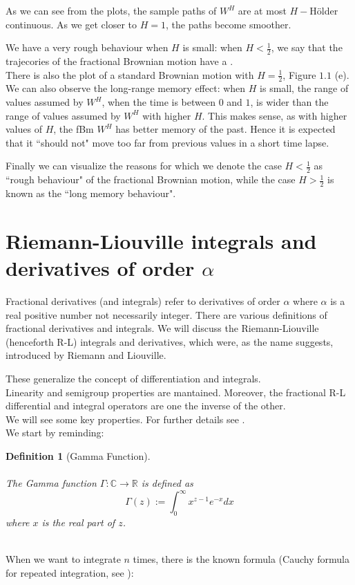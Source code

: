 \documentclass[a4paper,italian,11pt]{book}
\theoremstyle{plain}
\newtheorem{definition}{Definition}
\theoremstyle{remark}
\theoremstyle{plain}
\begin{document}
\medskip
\medskip

As we can see from the plots, the sample paths of $W^H$ are at most $H-$Hölder continuous. As we get closer to $H=1$, the paths become smoother. 

We have a very rough behaviour when $H$ is small: when $H<\frac{1}{2}$, we say that the trajecories of the fractional Brownian motion have a .\\
There is also the plot of a standard Brownian motion with $H=\frac{1}{2}$, Figure 
$1.1$ (e). \\

We can also observe the long-range memory effect: when $H$ is small, the range of values assumed by $W^H$, when the time is between $0$ and $1$, is wider than the range of values assumed by $W^H$ with higher $H$. This makes sense, as with higher values of $H$, the fBm $W^H$ has better memory of the past. Hence it is expected that it ``should not" move too far from previous values in a short time lapse. 

Finally we can visualize the reasons for which we denote the case $H<\frac{1}{2}$ as ``rough behaviour" of the fractional Brownian motion, while the case $H>\frac{1}{2}$ is known as the ``long memory behaviour".




\section{Riemann-Liouville integrals and derivatives of order $\alpha$}


Fractional derivatives (and integrals) refer to derivatives of order $\alpha$ where $\alpha$ is a real positive number not necessarily integer. There are various definitions of fractional derivatives and
integrals. We will discuss the Riemann-Liouville (henceforth R-L) integrals and derivatives, which were, as the name suggests, introduced by Riemann and Liouville. 

These generalize the concept of differentiation and integrals. \\ Linearity and semigroup properties are mantained. Moreover, the fractional R-L differential and integral operators are one the inverse of the other. 
\\
We will see some key properties. For further details see \cite{libro19}.\\

\noindent
We start by reminding:

\begin{definition}[Gamma Function]
\\\
\\
The Gamma function $\Gamma:\mathbb{C} \to \mathbb{R}$ is defined as 
\begin{equation}
\label{eq: gammafunction}
\Gamma(z) := \int_{0}^\infty x^{z-1}e^{-x}dx
\end{equation}
where $x$ is the real part of $z$.
\end{definition} 
\\
\noindent
When we want to integrate $n$ times, there is the known formula (Cauchy formula for repeated integration, see \cite{wikipediaCauchy}):
\end{document}
